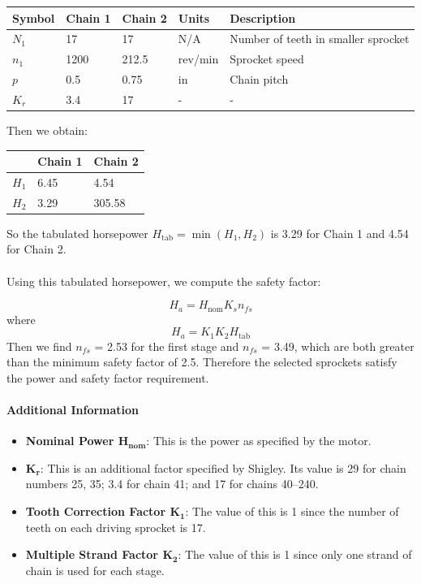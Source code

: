 \documentclass[letterpaper,12pt]{article}
\begin{document}
\begin{center}
	\begin{tabular}{ |p{1.5cm}||p{1.5cm}|p{1.5cm}|p{2cm}|p{7cm}|  }
		\hline
		Symbol & Chain 1 & Chain 2 & Units & Description\\
		\hline
		$N_1$ & 17 & 17 & N/A & Number of teeth in smaller sprocket\\
		$n_1$ & 1200 & 212.5 & rev/min & Sprocket speed  \\
        $p$ & 0.5 & 0.75 & in  & Chain pitch\\			
		$K_r$ & 3.4 & 17 & -  & -\\
		\hline
	\end{tabular}
\end{center}
Then we obtain:
\begin{center}
	\begin{tabular}{|p{1.5cm}|p{1.5cm}|p{1.5cm}| }
		\hline
		& Chain 1 & Chain 2\\
		\hline
		$H_1$ & 6.45 & 4.54\\
		$H_2$ & 3.29 & 305.58\\
		\hline
	\end{tabular}
\end{center}
So the tabulated horsepower $H_{\text{tab}} = \min(H_1, H_2)$ is 3.29 for Chain 1 and 4.54 for Chain 2.
\\\\
Using this tabulated horsepower, we compute the safety factor:

\begin{equation}
    H_a = H_{\text{nom}} K_s n_{fs} 
\end{equation}
where
\begin{equation}
    H_a = K_1 K_2 H_{\text{tab}}
\end{equation}
Then we find $n_{fs}$ = 2.53 for the first stage and $n_{fs}$ = 3.49, which are both greater than the minimum safety factor of 2.5. Therefore the selected sprockets satisfy the power and safety factor requirement.

\paragraph{Additional Information}
\begin{itemize}
    \itemsep0em
    \item \textbf{Nominal Power $\bm{H_{\text{nom}}}$}: This is the power as specified by the motor.
    \item $\bm{K_r}$: This is an additional factor specified by Shigley. Its value is 29 for chain numbers 25, 35; 3.4 for chain 41; and 17 for chains 40–240.
    \item \textbf{Tooth Correction Factor $\bm{K_1}$}: The value of this is 1 since the number of teeth on each driving sprocket is 17.
    \item \textbf{Multiple Strand Factor $\bm{K_2}$}: The value of this is 1 since only one strand of chain is used for each stage.
\end{itemize}
\end{document}
